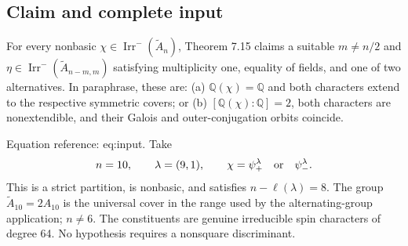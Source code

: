 \documentclass[10pt]{article}
\begin{document}
\subsection*{Claim and complete input}
For every nonbasic \(\chi\in\operatorname{Irr}^-(\widetilde A_n)\), Theorem 7.15 claims a suitable \(m\ne n/2\) and \(\eta\in\operatorname{Irr}^-(\widetilde A_{n-m,m})\) satisfying multiplicity one, equality of fields, and one of two alternatives. In paraphrase, these are: (a) \(\mathbb{Q}(\chi)=\mathbb{Q}\) and both characters extend to the respective symmetric covers; or (b) \([\mathbb{Q}(\chi):\mathbb{Q}]=2\), both characters are nonextendible, and their Galois and outer-conjugation orbits coincide.\par
Equation reference: eq:input. Take \[
 n=10,\qquad \lambda=(9,1),\qquad
 \chi=\psi^\lambda_+\quad\hbox{or}\quad\psi^\lambda_- .\] This is a strict partition, is nonbasic, and satisfies \(n-\ell(\lambda)=8\). The group \(\widetilde A_{10}=2A_{10}\) is the universal cover in the range used by the alternating-group application; \(n\ne6\). The constituents are genuine irreducible spin characters of degree 64. No hypothesis requires a nonsquare discriminant.\par
\end{document}
